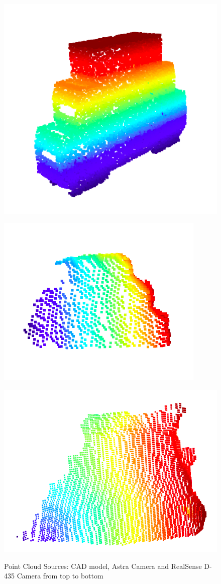 \begin{figure}[htp]
\begin{center}
{
  \includegraphics[clip,width=0.6\columnwidth]{images/cad_cloud.png}
}
\end{center}
\begin{center}
{
  \includegraphics[clip,width=0.6\columnwidth]{images/astra_cloud.png}
}
\end{center}
\begin{center}
{
  \includegraphics[clip,width=0.6\columnwidth]{images/real_cloud.png}
}
\end{center}
\caption{Point Cloud Sources: CAD model, Astra Camera and RealSense D-435 Camera from top to bottom}
\label{cadastracloudresult}
\end{figure}

